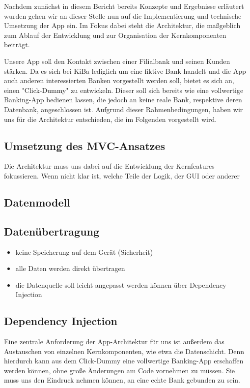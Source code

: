 	Nachdem zunächst in diesem Bericht bereits Konzepte und Ergebnisse erläutert wurden gehen wir an dieser Stelle nun auf die Implementierung und technische Umsetzung der App ein. Im Fokus dabei steht die Architektur, die maßgeblich zum Ablauf der Entwicklung und zur Organisation der Kernkomponenten beiträgt.
	
	Unsere App soll den Kontakt zwischen einer Filialbank und seinen Kunden stärken. Da es sich bei KiBa lediglich um eine fiktive Bank handelt und die App auch anderen interessierten Banken vorgestellt werden soll, bietet es sich an, einen "Click-Dummy" zu entwickeln. Dieser soll sich bereits wie eine vollwertige Banking-App bedienen lassen, die jedoch an keine reale Bank, respektive deren Datenbank, angeschlossen ist. Aufgrund dieser Rahmenbedingungen, haben wir uns für die Architektur entschieden, die im Folgenden vorgestellt wird.

\subsection{Umsetzung des MVC-Ansatzes}
	Die Architektur muss uns dabei auf die Entwicklung der Kernfeatures fokussieren. Wenn nicht klar ist, welche Teile der Logik, der GUI oder anderer 

\subsection{Datenmodell}
	

\subsection{Datenübertragung}
\begin{itemize}
	\item keine Speicherung auf dem Gerät (Sicherheit)
	\item alle Daten werden direkt übertragen
	\item die Datenquelle soll leicht angepasst werden können über Dependency Injection
\end{itemize}

\subsection{Dependency Injection}
	Eine zentrale Anforderung der App-Architektur für uns ist außerdem das Austauschen von einzelnen Kernkomponenten, wie etwa die Datenschicht. Denn hierdurch kann aus dem Click-Dummy eine vollwertige Banking-App erschaffen werden können, ohne große Änderungen am Code vornehmen zu müssen.  Sie muss uns den Eindruck nehmen können, an eine echte Bank gebunden zu sein.
	
